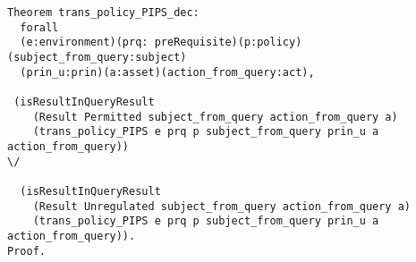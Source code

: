 \begin{lstlisting}
Theorem trans_policy_PIPS_dec:
  forall
  (e:environment)(prq: preRequisite)(p:policy)(subject_from_query:subject)
  (prin_u:prin)(a:asset)(action_from_query:act),

 (isResultInQueryResult
    (Result Permitted subject_from_query action_from_query a)
    (trans_policy_PIPS e prq p subject_from_query prin_u a action_from_query))
\/

  (isResultInQueryResult
    (Result Unregulated subject_from_query action_from_query a)
    (trans_policy_PIPS e prq p subject_from_query prin_u a action_from_query)).
Proof.

\end{lstlisting}





















